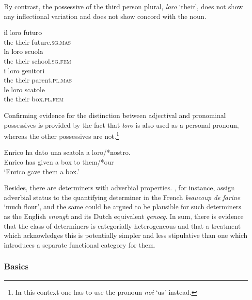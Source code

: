 \documentclass[output=paper
                ,modfonts
                ,nonflat
	        ,collection
	        ,collectionchapter
	        ,collectiontoclongg
 	        ,biblatex
                ,babelshorthands
                ,newtxmath
                ,draftmode
                ,colorlinks, citecolor=brown
]{./langsci/langscibook}
\begin{document}
\noindent
By contrast, the possessive of the third person plural, \emph{loro} `their',
does not show any inflectional variation and does not show concord with the noun.

\begin{exe} 
\ex 
\begin{xlist}
\ex 
\gll  il loro futuro \\   
      the their future.\textsc{sg.mas}  \\ 
\ex 
\gll  la loro scuola  \\   
      the their school.\textsc{sg.fem}   \\ 
\ex 
\gll  i loro genitori \\   
      the their parent.\textsc{pl.mas} \\ 
\ex 
\gll  le loro scatole \\   
      the their box.\textsc{pl.fem} \\ 
\end{xlist} 
\end{exe}

\noindent
Confirming evidence for the distinction between adjectival and pronominal possessives
is provided by the fact that \emph{loro} is also used as a personal pronoun, 
whereas the other possessives are not.\footnote{In this context one has to use 
the pronoun \emph{noi} `us' instead.} 

\begin{exe} 
\ex 
\gll   Enrico ha dato una scatola a loro/*nostro. \\
       Enrico has given a box to them/*our        \\
\trans `Enrico gave them a box.'
\end{exe} 

\noindent
Besides, there are determiners with adverbial properties. 
\citet{Abeilleetal04}, for instance, 
assign adverbial status to the quantifying determiner in the French 
\emph{beaucoup de farine} `much flour', and the same could be argued to 
be plausible for such determiners as the English \emph{enough} and its 
Dutch equivalent \emph{genoeg}. 
In sum, there is evidence that the class of determiners is categorially 
heterogeneous and that a treatment which acknowledges this is potentially 
simpler and less stipulative than one which introduces a separate functional 
category for them. 
 

\subsubsection{Basics} 
\label{sec-basics}
\end{document}

